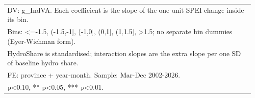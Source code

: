 {\begin{tabular}{l*{6}{c}}
\multicolumn{7}{l}{\footnotesize DV: g\_IndVA. Each coefficient is the slope of the one-unit SPEI change inside its bin.}\\
\multicolumn{7}{l}{\footnotesize Bins: <=-1.5, (-1.5,-1], (-1,0], (0,1], (1,1.5], >1.5; no separate bin dummies (Eyer-Wichman form).}\\
\multicolumn{7}{l}{\footnotesize HydroShare is standardised; interaction slopes are the extra slope per one SD of baseline hydro share.}\\
\multicolumn{7}{l}{\footnotesize FE: province + year-month. Sample: Mar-Dec 2002-2026.}\\
\multicolumn{7}{l}{\footnotesize * p<0.10, ** p<0.05, *** p<0.01.}\\
\end{tabular}
}
